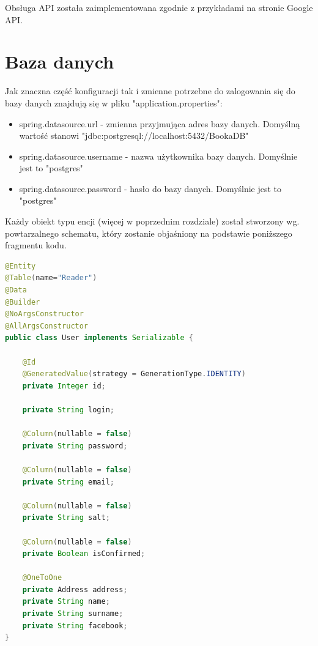 \documentclass{report}
\begin{document}
	Obsługa API została zaimplementowana zgodnie z przykładami na stronie Google API.
	
	\section{Baza danych}
	
		Jak znaczna część konfiguracji tak i zmienne potrzebne do zalogowania się do bazy danych znajdują się w pliku "application.properties":

		\begin{itemize}
			\item spring.datasource.url - zmienna przyjmująca adres bazy danych. Domyślną wartość stanowi "jdbc:postgresql://localhost:5432/BookaDB"
			\item spring.datasource.username - nazwa użytkownika bazy danych. Domyślnie jest to "postgres"
			\item spring.datasource.password - hasło do bazy danych. Domyślnie jest to "postgres"
		\end{itemize}

		Każdy obiekt typu encji (więcej w poprzednim rozdziale) został stworzony wg. powtarzalnego schematu, który zostanie objaśniony na podstawie poniższego fragmentu kodu.

		\begin{lstlisting}[language=Java, breaklines]
@Entity
@Table(name="Reader")
@Data
@Builder
@NoArgsConstructor
@AllArgsConstructor
public class User implements Serializable {

    @Id
    @GeneratedValue(strategy = GenerationType.IDENTITY)
    private Integer id;

    private String login;

    @Column(nullable = false)
    private String password;

    @Column(nullable = false)
    private String email;

    @Column(nullable = false)
    private String salt;

    @Column(nullable = false)
    private Boolean isConfirmed;

    @OneToOne
    private Address address;
    private String name;
    private String surname;
    private String facebook;
}
		\end{lstlisting}
\end{document}
